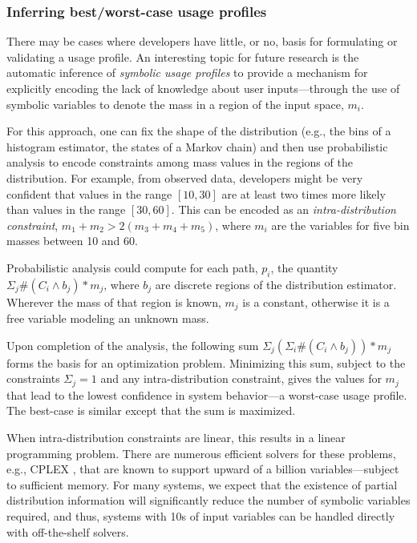 \subsubsection{Inferring best/worst-case usage profiles}
There may be cases where developers have little, or no, basis for
formulating or validating a usage profile.  An interesting topic for
future research is the automatic inference of {\em symbolic usage
  profiles} to provide a mechanism for explicitly encoding the lack of
knowledge about user inputs---through the use of symbolic variables
to denote the mass in a region of the input space, $m_i$.

For this approach, one can fix the shape of the
distribution (e.g., the bins of a histogram estimator, the states of a
Markov chain) and then use probabilistic analysis to encode
constraints among mass values in the regions of the distribution.  
For example, from observed data, developers might be
very confident that values in the range $[10,30]$ are at least two
times more likely than values in the range $[30,60]$.  This can be
encoded as an \textit{intra-distribution constraint}, $m_1 + m_2 >
2(m_3 + m_4 + m_5)$, where $m_i$ are the variables for five bin masses
between 10 and 60.

Probabilistic analysis could compute for each path, $p_i$,
the quantity $\Sigma_{j} \#(C_i \wedge b_j)*m_j$, where $b_j$ are discrete
regions of the distribution estimator.  Wherever the mass
of that region is known, $m_j$ is a constant, otherwise it is
a free variable modeling an unknown mass.

Upon completion of the analysis, the following sum
$\Sigma_{j} (\Sigma_i \#(C_i \wedge b_j)) *m_j$
forms the basis for an optimization problem.
Minimizing this sum, subject to the constraints  
$\Sigma_j = 1$ and any intra-distribution constraint, gives
the values for $m_j$ that lead to the lowest confidence in
system behavior---a worst-case usage profile.  The best-case
is similar except that the sum is maximized.

When intra-distribution constraints are linear, this results
in a linear programming problem.  There are numerous efficient solvers
for these problems, e.g., CPLEX \cite{cplex2009v12}, that are known to
support upward of a billion variables---subject to sufficient memory.
For many systems, we expect that the existence of partial distribution
information
will significantly reduce the number of symbolic variables required,
and thus, systems with 10s of input variables can be handled
directly with off-the-shelf solvers. 

